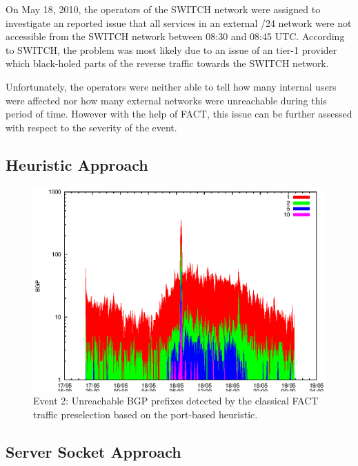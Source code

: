On May 18, 2010, the operators of the SWITCH network were assigned to investigate an reported issue that all services in an external /24 network were not accessible from the SWITCH network between 08:30 and 08:45 UTC. According to SWITCH, the problem was most likely due to an issue of an tier-1 provider which black-holed parts of the reverse traffic towards the SWITCH network\citep{SchatzmannPAM2011}.

Unfortunately, the operators were neither able to tell how many internal users were affected nor how many external networks were unreachable during this period of time. However with the help of FACT, this issue can be further assessed with respect to the severity of the event\citep{SchatzmannPAM2011}.

\subsection{Heuristic Approach}

\begin{figure}
	[p] \centering 
	\includegraphics[width=0.75\linewidth]{images/events/2010_05_18/bgp_log_port80_ref.eps}
	\caption{Event 2: Unreachable BGP prefixes detected by the classical FACT traffic preselection based on the port-based heuristic.} 
	\label{fig:TIER1_FACT_REF} 
\end{figure}

\subsection{Server Socket Approach}

